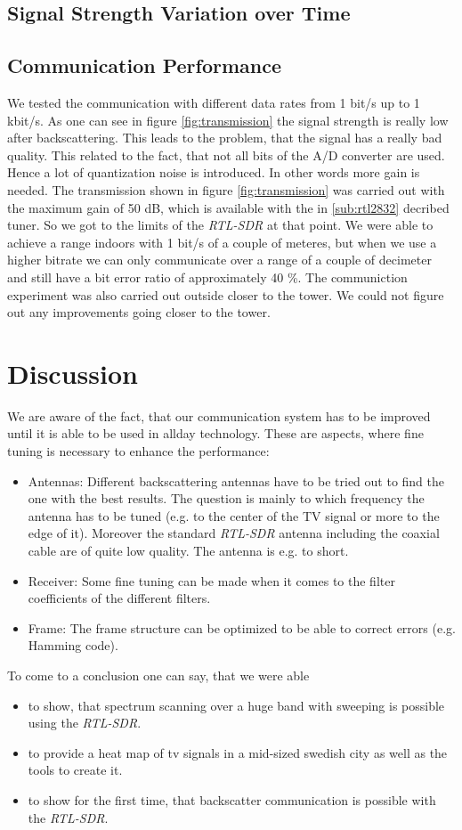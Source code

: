 \documentclass[conference]{IEEEtran}
\begin{document}
\subsection{Signal Strength Variation over Time}

\subsection{Communication Performance}
We tested the communication with different data rates from 1 bit/s up to 1 kbit/s. As one can see in figure \ref{fig:transmission} the signal strength is really low after backscattering. This leads to the problem, that the signal has a really bad quality. This related to the fact, that not all bits of the A/D converter are used. Hence a lot of quantization noise is introduced. In other words more gain is needed. The transmission shown in figure \ref{fig:transmission} was carried out with the maximum gain of 50 dB, which is available with the in \ref{sub:rtl2832} decribed tuner. So we got to the limits of the \textit{RTL-SDR} at that point. We were able to achieve a range indoors with 1 bit/s of a couple of meteres, but when we use a higher bitrate we can only communicate over a range of a couple of decimeter and still have a bit error ratio of approximately 40 \%. The communiction experiment was also carried out outside closer to the tower. We could not figure out any improvements going closer to the tower.  
\section{Discussion}
We are aware of the fact, that our communication system has to be improved until it is able to be used in allday technology. These are aspects, where fine tuning is necessary to enhance the performance:
\begin{itemize}
	\item Antennas: Different backscattering antennas have to be tried out to find the one with the best results. The question is mainly to which frequency the antenna has to be tuned (e.g. to the center of the TV signal or more to the edge of it). Moreover the standard \textit{RTL-SDR} antenna including the coaxial cable are of quite low quality. The antenna is e.g. to short. 
	\item Receiver: Some fine tuning can be made when it comes to the filter coefficients of the different filters.
	\item Frame: The frame structure can be optimized to be able to correct errors (e.g. Hamming code).  
\end{itemize}   
To come to a conclusion one can say, that we were able
\begin{itemize}
	\item to show, that spectrum scanning over a huge band with sweeping is possible using the \textit{RTL-SDR}.
	\item to provide a heat map of tv signals in a mid-sized swedish city as well as the tools to create it.
	\item to show for the first time, that backscatter communication is possible with the \textit{RTL-SDR}.
\end{itemize}
\end{document}
